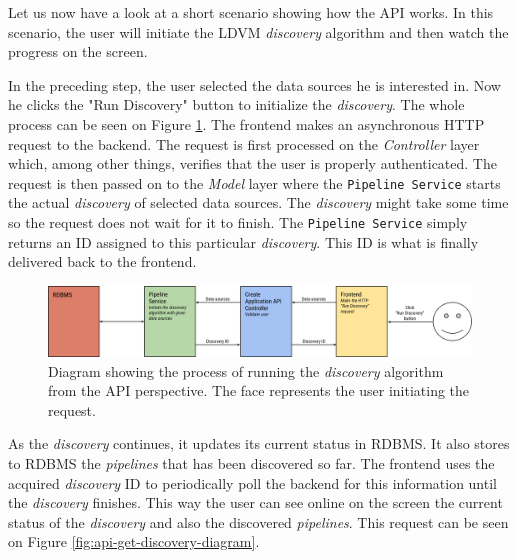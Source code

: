 Let us now  have a look at a short scenario showing how the API works. In this scenario, the user will initiate the LDVM \emph{discovery} algorithm and then watch the progress on the screen.

In the preceding step, the user selected the data sources he is interested in. Now he clicks the "Run Discovery" button to initialize the \emph{discovery}. The whole process can be seen on Figure \ref{fig:api-run-discovery-diagram}. The frontend makes an asynchronous HTTP request to the backend. The request is first processed on the \emph{Controller} layer which, among other things, verifies that the user is properly authenticated. The request is then passed on to the \emph{Model} layer where the \texttt{Pipeline Service} starts the actual \emph{discovery} of selected data sources. The \emph{discovery} might take some time so the request does not wait for it to finish. The \texttt{Pipeline Service} simply returns an ID assigned to this particular \emph{discovery}. This ID is what is finally delivered back to the frontend.

\begin{figure}
	\centering
	\includegraphics[width=140mm]{img/04_api_run_discovery_diagram.png}
	\caption{Diagram showing the process of running the \emph{discovery} algorithm from the API perspective. The face represents the user initiating the request.} 
	\label{fig:api-run-discovery-diagram}
\end{figure}

As the \emph{discovery} continues, it updates its current status in RDBMS. It also stores to RDBMS the \emph{pipelines} that has been discovered so far. The frontend uses the acquired \emph{discovery} ID to periodically poll the backend for this information until the \emph{discovery} finishes. This way the user can see online on the screen the current status of the \emph{discovery} and also the discovered \emph{pipelines}. This request can be seen on Figure \ref{fig:api-get-discovery-diagram}.

